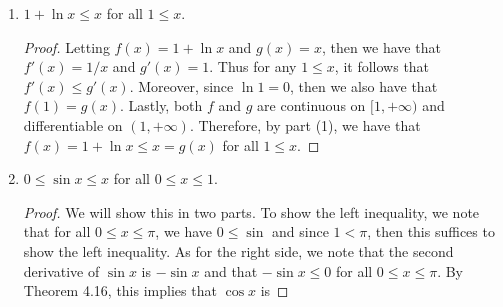 \documentclass[12pt]{article}
\theoremstyle{definition}
\begin{document}
\begin{enumerate}
\begin{enumerate}[label=(\arabic*)]
\begin{proof}
\begin{equation*}
                                        g'(x_0)=f'(x_0)\frac{g(x)-g(x)}{f(x)-f(a)}
                                    \end{equation*}
                                Seeing as $f(a)=g(a)$ and $g(x)<f(x)$, then it
                                follows that 
                                    \begin{equation*}
                                        g'(x_0)=f'(x_0)\frac{g(x)-g(x)}{f(x)-f(a)}<f'(x_0).
                                    \end{equation*}
                                Thus, for some $a<x_0$, we have
                                $g'(x_0)<f'(x_0)$, which contradicts our
                                assumption. 
                            \end{proof}
                        \item $1+\ln x\leq x$ for all $1\leq x$.
                            \begin{proof}
                                Letting $f(x)=1+\ln x$ and $g(x)=x$, then we
                                have that $f'(x)=1/x$ and $g'(x)=1$. Thus for
                                any $1\leq x$, it follows that $f'(x)\leq
                                g'(x)$. Moreover, since $\ln 1=0$, then we also
                                have that $f(1)=g(x)$. Lastly, both $f$ and $g$
                                are continuous on $[1, +\infty)$ and
                                differentiable on $(1, +\infty)$. Therefore, by
                                part (1), we have that $f(x)=1+\ln x\leq
                                x=g(x)$ for all $1\leq x$.
                            \end{proof}
                        \item $0\leq \sin x\leq x$ for all $0\leq x\leq 1$.
                            \begin{proof}
                                We will show this in two parts. To show the
                                left inequality, we note that for all $0\leq
                                x\leq\pi$, we have $0\leq\sin $ and since
                                $1<\pi$, then this suffices to show the left
                                inequality. As for the right side, we note that
                                the second derivative of $\sin x$ is $-\sin x$ and that
                                $-\sin x\leq 0$ for all $0\leq x\leq \pi$. By
                                Theorem 4.16, this implies that $\cos x$ is

\end{proof}
\end{enumerate}
\end{enumerate}
\end{document}
